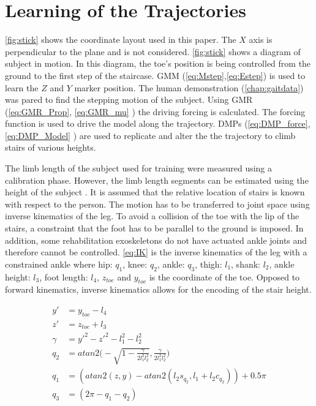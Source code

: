 \section{Learning of the Trajectories}


\autoref{fig:stick} shows the coordinate layout used in this paper. The $X$ axis is perpendicular to the plane and is not considered. \autoref{fig:stick} shows a diagram of subject in motion. In this diagram, the toe's position is being controlled from the ground to the first step of the staircase. GMM (\autoref{eq:Mstep},\autoref{eq:Estep}) is used to learn the $Z$ and $Y$ marker position. The human demonstration (\autoref{chap:gaitdata}) was pared to find the stepping motion of the subject. Using GMR (\autoref{eq:GMR_Prop}, \autoref{eq:GMR_mu} ) the driving forcing is calculated. The forcing function is used to drive the model along the trajectory. DMPs (\autoref{eq:DMP_force}, \autoref{eq:DMP_Model} ) are used to replicate and alter the the trajectory to climb stairs of various heights.  


The limb length of the subject used for training were measured using a calibration phase. However, the limb length segments can be estimated using the height of the subject \cite{anthropomorphic}. It is assumed that the relative location of stairs is known with respect to the person. The motion has to be transferred to joint space using inverse kinematics of the leg. To avoid a collision of the toe with the lip of the stairs, a constraint that the foot has to be parallel to the ground is imposed. In addition, some rehabilitation exoskeletons do not have actuated ankle joints and therefore cannot be controlled.  \autoref{eq:IK} is the inverse kinematics of the leg with a constrained ankle where hip: $q_1$, knee: $q_2$, ankle: $q_3$, thigh: $l_1$, shank: $l_2$, ankle height: $l_3$, foot length: $l_4$, $z_{toe}$ and $y_{toe}$ is the coordinate of the toe. Opposed to forward kinematics, inverse kinematics allows for the encoding of the stair height. 

\begin{equation} 
    \begin{aligned} 
        y' &= y_{toe} - l_4 \\ 
        z' &= z_{toe} + l_3 \\  
        \gamma &= y'^2 - z'^2 - l_1^2  - l_2^2 \\ 
        q_2 &= atan2 \Bigg( -\sqrt{1 - \frac{\gamma }{2 l_1^2 l_2^2}}, \frac{\gamma}{2 l_1^2 l_2^2}\Bigg)\\ 
        q_1 &= (atan2(z, y) - atan2( l_2 s_{q_2}, l_1 + l_2 c_{q_2})) + 0.5\pi \\ 
        q_3 &= (2\pi - q_1 - q_2) 
    \end{aligned} 
    \label{eq:IK} 
\end{equation} 

